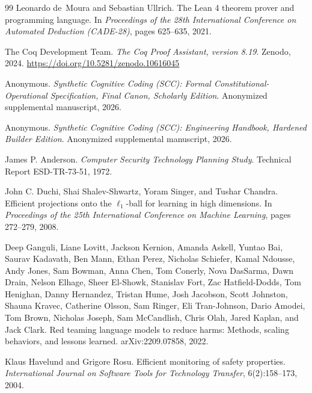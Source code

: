 \documentclass{article}
\begin{document}
\begin{thebibliography}{99}
Leonardo de~Moura and Sebastian Ullrich.
The {Lean 4} theorem prover and programming language.
In \emph{Proceedings of the 28th International Conference on Automated Deduction (CADE-28)}, pages 625--635, 2021.

{The Coq Development Team}.
\emph{The {Coq} Proof Assistant, version 8.19}.
Zenodo, 2024. \url{https://doi.org/10.5281/zenodo.10616045}

Anonymous. \emph{Synthetic Cognitive Coding (SCC): Formal Constitutional-Operational Specification, Final Canon, Scholarly Edition}. Anonymized supplemental manuscript, 2026.

Anonymous. \emph{Synthetic Cognitive Coding (SCC): Engineering Handbook, Hardened Builder Edition}. Anonymized supplemental manuscript, 2026.

James P. Anderson. \emph{Computer Security Technology Planning Study}. Technical Report ESD-TR-73-51, 1972.

John C. Duchi, Shai Shalev-Shwartz, Yoram Singer, and Tushar Chandra. Efficient projections onto the $\ell_1$-ball for learning in high dimensions. In \emph{Proceedings of the 25th International Conference on Machine Learning}, pages 272--279, 2008.

Deep Ganguli, Liane Lovitt, Jackson Kernion, Amanda Askell, Yuntao Bai, Saurav Kadavath, Ben Mann, Ethan Perez, Nicholas Schiefer, Kamal Ndousse, Andy Jones, Sam Bowman, Anna Chen, Tom Conerly, Nova DasSarma, Dawn Drain, Nelson Elhage, Sheer El-Showk, Stanislav Fort, Zac Hatfield-Dodds, Tom Henighan, Danny Hernandez, Tristan Hume, Josh Jacobson, Scott Johnston, Shauna Kravec, Catherine Olsson, Sam Ringer, Eli Tran-Johnson, Dario Amodei, Tom Brown, Nicholas Joseph, Sam McCandlish, Chris Olah, Jared Kaplan, and Jack Clark. Red teaming language models to reduce harms: Methods, scaling behaviors, and lessons learned. arXiv:2209.07858, 2022.

Klaus Havelund and Grigore Rosu. Efficient monitoring of safety properties. \emph{International Journal on Software Tools for Technology Transfer}, 6(2):158--173, 2004.


\end{thebibliography}
\end{document}
